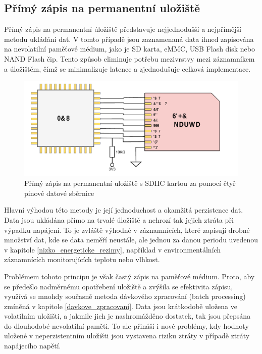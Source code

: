 \subsection{Přímý zápis na permanentní uložiště}
Přímý zápis na permanentní úložiště představuje nejjednodušší a nejpřímější metodu ukládání dat. V tomto případě jsou zaznamenaná data ihned zapisována na nevolatilní paměťové médium, jako je SD karta, eMMC, USB Flash disk nebo NAND Flash čip. Tento způsob eliminuje potřebu mezivrstvy mezi záznamníkem a úložištěm, čímž se minimalizuje latence a zjednodušuje celková implementace.

\begin{figure}[h]
    \centering
    \includegraphics[width=1.00\textwidth]{obrazky-figures/forward_write.pdf}
    
    \caption{Přímý zápis na permanentní uložiště s SDHC kartou za pomocí čtyř pinové datové sběrnice}
    \label{fig:forward-write}
\end{figure}

Hlavní výhodou této metody je její jednoduchost a okamžitá perzistence dat. Data jsou ukládána přímo na trvalé úložiště a nehrozí tak jejich ztráta při výpadku napájení. To je zvláště výhodné v záznamnících, které zapisují drobné množství dat, kde se data neměří neustále, ale jednou za danou periodu uvedenou v kapitole \ref{nizko_energeticke_rezimy}, například v environmentálních záznamnících monitorujících teplotu nebo vlhkost.

Problémem tohoto principu je však častý zápis na paměťové médium. Proto, aby se předešlo nadměrnému opotřebení uložiště a zvýšila se efektivita zápisu, využívá se mnohdy současně metoda dávkového zpracování (batch processing) zmíněná v kapitole \ref{davkove_zpracovani}. Data jsou krátkodobě uložena ve volatilním uložišti, a jakmile jich je nashromážděno dostatek, tak jsou přepsána do dlouhodobé nevolatilní paměti. To ale přináší i nové problémy, kdy hodnoty uložené v neperzistentním uložišti jsou vystavena riziku ztráty v případě ztráty napájecího napětí.

